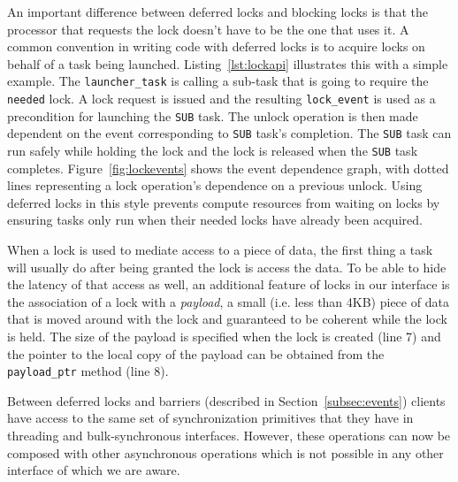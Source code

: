 An important difference between deferred locks and blocking locks is that the processor
that requests the lock doesn't have to be the one that uses it.  A common
convention in writing code with deferred locks is to acquire locks on behalf of a task being
launched.  Listing~\ref{lst:lockapi} illustrates this with a simple example.  The
{\tt launcher\_task} is calling a sub-task that is going to require the {\tt needed}
lock.  A lock request is issued and the resulting {\tt lock\_event} is used as
a precondition for launching the {\tt SUB} task.  The unlock operation is then
made dependent
on the event corresponding to {\tt SUB} task's completion.  The
{\tt SUB} task can run safely while holding the lock and the lock is released when the
{\tt SUB} task completes.  Figure~\ref{fig:lockevents} shows the event dependence graph, with
dotted lines representing a lock operation's dependence on a previous unlock.
Using deferred locks in this style prevents 
compute resources from waiting on locks by ensuring tasks only run when their needed
locks have already been acquired.

When a lock is used to mediate access to a piece of data, the first thing a task will usually
do after being granted the lock is access the data.  To be able to hide the latency of that
access as well, an additional feature of locks in our interface is the association of a lock with a
{\em payload}, a small (i.e. less than 4KB) 
piece of data that is moved around with the lock and guaranteed to be coherent while 
the lock is held.  The size of the payload is specified when the lock is created (line 7) and
the pointer to the local copy of the payload can be obtained from the {\tt payload\_ptr} method
(line 8).

Between deferred locks and barriers (described in Section~\ref{subsec:events}) clients 
have access to the same set of synchronization primitives that they have
in threading and bulk-synchronous interfaces.  However, these operations can now 
be composed with other asynchronous operations which is not possible in any other interface
of which we are aware.



